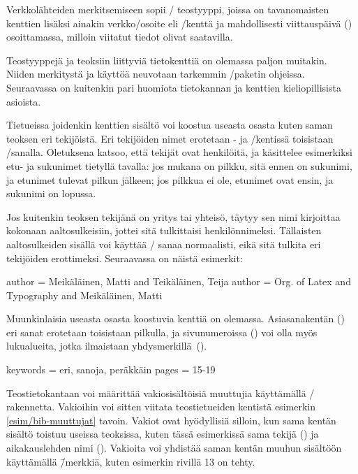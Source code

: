 Verkkolähteiden merkitsemiseen sopii \-/ teostyyppi,
joissa on tavanomaisten kenttien lisäksi ainakin verkko\-/osoite eli
\-/kenttä ja mahdollisesti viittauspäivä ()
osoittamassa, milloin viitatut tiedot olivat saatavilla.

Teostyyppejä ja teoksiin liittyviä tietokenttiä on olemassa paljon
muitakin. Niiden merkitystä ja käyttöä neuvotaan tarkemmin
\-/paketin ohjeissa. Seuraavassa on kuitenkin pari
huomiota tietokannan ja kenttien kieliopillisista asioista.

Tietueissa joidenkin kenttien sisältö voi koostua useasta osasta kuten
saman teoksen eri tekijöistä. Eri tekijöiden nimet erotetaan
- ja \-/kentissä toisistaan
\-/sanalla. Oletuksena  katsoo, että
tekijät ovat henkilöitä, ja käsittelee esimerkiksi etu- ja sukunimet
tietyllä tavalla: jos mukana on pilkku, sitä ennen on sukunimi, ja
etunimet tulevat pilkun jälkeen; jos pilkkua ei ole, etunimet ovat
ensin, ja sukunimi on lopussa.

Jos kuitenkin teoksen tekijänä on yritys tai yhteisö, täytyy sen nimi
kirjoittaa kokonaan aaltosulkeisiin, jottei sitä tulkittaisi
henkilönnimeksi. Tällaisten aaltosulkeiden sisällä voi käyttää
\-/ sanaa normaalisti, eikä sitä tulkita eri tekijöiden
erottimeksi. Seuraavassa on näistä esimerkit:

\begin{koodilohkosis}
author = {Meikäläinen, Matti and Teikäläinen, Teija}
author = {{Org. of Latex and Typography} and Meikäläinen, Matti}
\end{koodilohkosis}

Muunkinlaisia useasta osasta koostuvia kenttiä on olemassa.
Asiasanakentän () eri sanat erotetaan toisistaan
pilkulla, ja sivunumeroissa () voi olla myös lukualueita,
jotka ilmaistaan yhdysmerkillä~\mbox{(\koodi{-})}.

\begin{koodilohkosis}
keywords = {eri, sanoja, peräkkäin}
pages = {15-19}
\end{koodilohkosis}

Teostietokantaan voi määrittää vakiosisältöisiä muuttujia käyttämällä
\-/ rakennetta. Vakioihin voi sitten viitata
teostietueiden kentistä esimerkin \ref{esim/bib-muuttujat} tavoin.
Vakiot ovat hyödyllisiä silloin, kun sama kentän sisältö toistuu useissa
teoksissa, kuten tässä esimerkissä sama tekijä () ja
aikakauslehden nimi (). Vakioita voi yhdistää
saman kentän muuhun sisältöön käyttämällä \koodi{\#}\=/merkkiä, kuten
esimerkin rivillä 13 on tehty.

